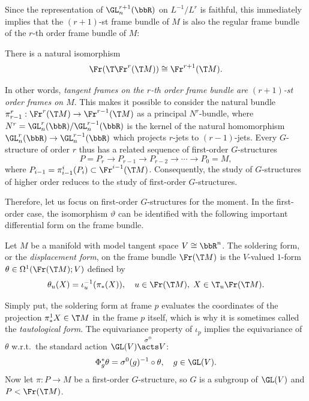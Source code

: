 Since the representation of $\GL_n^{r+1}(\bbR)$ on $L^{-1}\slash L^r$ is faithful, this immediately implies that the $(r+1)$-st frame bundle of $M$ is also the regular frame bundle of the $r$-th order frame bundle of $M$:
\begin{cor}
    There is a natural isomorphism 
    \[\Fr(\T \Fr^r(\T M))\cong \Fr^{r+1}(\T M).\]
\end{cor}

In other words, \emph{tangent frames on the $r$-th order frame bundle are $(r+1)$-st order frames on $M$}. This makes it possible to consider the natural bundle $\pi^r_{r-1}:\Fr^r(\T M)\to \Fr^{r-1}(\T M)$ as a principal $N^r$-bundle, where $N^r=\GL^r_n(\bbR)\slash \GL^{r-1}_n(\bbR)$ is the kernel of the natural homomorphism $\GL^r_n(\bbR)\to \GL^{r-1}_n(\bbR)$ which projects $r$-jets to $(r-1)$-jets. Every $G$-structure of order $r$ thus has a related sequence of first-order $G$-structures
\[P=P_r\to P_{r-1}\to P_{r-2}\to \cdots \to P_0=M,\]
where $P_{i-1}=\pi^i_{i-1}(P_i)\subset \Fr^{i-1}(\T M)$. Consequently, the study of $G$-structures of higher order reduces to the study of first-order $G$-structures.

Therefore, let us focus on first-order $G$-structures for the moment. In the first-order case, the isomorphism $\vartheta$ can be identified with the following important differential form on the frame bundle.

\begin{defn}
    Let $M$ be a manifold with model tangent space $V\cong\bbR^n$. The soldering form, or the \emph{displacement form}, on the frame bundle $\Fr(\T M)$ is the $V$-valued $1$-form $\theta\in \Omega^1(\Fr(\T M);V)$ defined by 
    \[\theta_u(X)=\iota_u^{-1}(\pi_\ast(X)),\quad u\in\Fr(\T M),\; X\in \T_u \Fr(\T M).\]
\end{defn}

Simply put, the soldering form at frame $p$ evaluates the coordinates of the projection $\pi^1_\ast X\in \T M$ in the frame $p$ itself, which is why it is sometimes called the \emph{tautological form}. The equivariance property of $\iota_p$ implies the equivariance of $\theta$ w.r.t.\ the standard action $\GL(V)\overset{\sigma^0}{\acts}V$:
\[\Phi_g^\ast\theta=\sigma^0(g)^{-1}\circ \theta,\quad g\in \GL(V).\]
Now let $\pi:P\to M$ be a first-order $G$-structure, so $G$ is a subgroup of $\GL(V)$ and $P<\Fr(\T M)$. 

